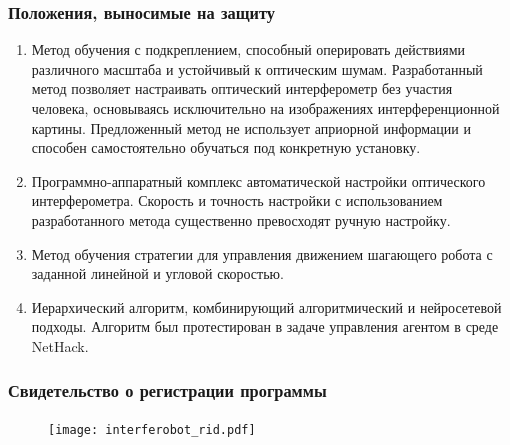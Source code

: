 \begin{frame}
\frametitle{Положения, выносимые на защиту}
\begin{enumerate}
  \item Метод обучения с подкреплением, способный оперировать действиями различного масштаба и устойчивый к оптическим шумам. Разработанный метод позволяет настраивать оптический интерферометр без участия человека, основываясь исключительно на изображениях интерференционной картины. Предложенный метод не использует априорной информации и способен самостоятельно обучаться под конкретную установку.
  \item Программно-аппаратный комплекс автоматической настройки оптического интерферометра. Скорость и точность настройки с использованием разработанного метода существенно превосходят ручную настройку.
  \item Метод обучения стратегии для управления движением шагающего робота с заданной линейной и угловой скоростью.
  \item Иерархический алгоритм, комбинирующий алгоритмический и нейросетевой подходы. Алгоритм был протестирован в задаче управления агентом в среде NetHack.
    \end{enumerate}
\end{frame}

\begin{frame}
    \frametitle{Свидетельство о регистрации программы}
    \begin{figure}[h]
        \centering
        \texttt{[image: interferobot\_rid.pdf]}
    \end{figure}
\end{frame}


